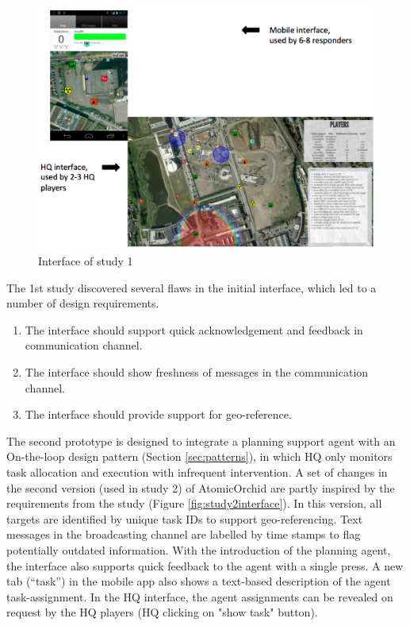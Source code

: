 \begin{figure}[H]
  \centering
  \includegraphics[width=1\textwidth]{img/conclusion/study1interface}
  \caption{Interface of study 1}
  \label{fig:study1interface}
\end{figure}



The 1st study discovered several flaws in the initial interface, which led to a number of design requirements. 

\begin{enumerate}
	 \item The interface should support quick acknowledgement and feedback in communication channel.
	 \item The interface should show freshness of messages in the communication channel.
	 \item The interface should provide support for geo-reference.
\end{enumerate}

The second prototype is designed to integrate a planning support agent with an On-the-loop design pattern (Section \ref{sec:patterns}), in which HQ only monitors task allocation and execution with infrequent intervention. A set of changes in the second version (used in study 2) of AtomicOrchid are partly inspired by the requirements from the study (Figure \ref{fig:study2interface}). In this version, all targets are identified by unique task IDs to support geo-referencing. Text messages in the broadcasting channel are labelled by time stamps to flag potentially outdated information. With the introduction of the planning agent, the interface also supports quick feedback to the agent with a single press. A new tab (``task'') in the mobile app also shows a text-based description of the agent task-assignment. In the HQ interface, the agent assignments can be revealed on request by the HQ players (HQ clicking on "show task" button).\\

